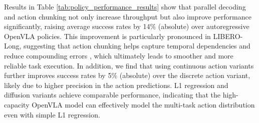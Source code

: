 \documentclass[conference]{IEEEtran}
\begin{document}
Results in Table \ref{tab:policy_performance_results} show that parallel decoding and action chunking not only increase throughput but also improve performance significantly, raising average success rates by 14\% (absolute) over autoregressive OpenVLA policies. This improvement is particularly pronounced in LIBERO-Long, suggesting that action chunking helps capture temporal dependencies \citep{liu2024bidirectional} and reduce compounding errors \citep{ross2011reduction}, which ultimately leads to smoother and more reliable task execution. In addition, we find that using continuous action variants further improves success rates by 5\% (absolute) over the discrete action variant, likely due to higher precision in the action predictions. L1 regression and diffusion variants achieve comparable performance, indicating that the high-capacity OpenVLA model can effectively model the multi-task action distribution even with simple L1 regression.
\end{document}
